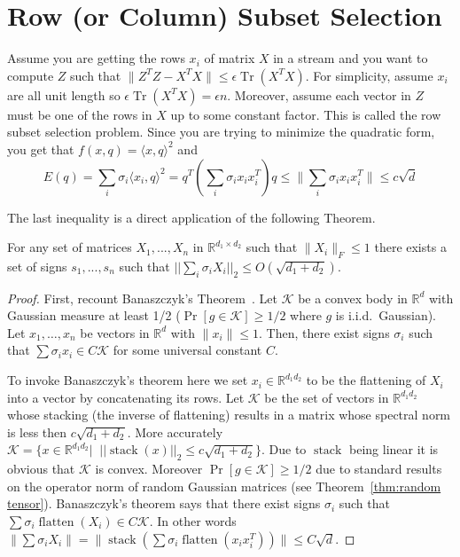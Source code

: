 \documentclass[anon,12pt]{colt2019} %
\newcommand{\R}{\mathbb{R}}
\newcommand{\eps}{\epsilon}
\renewcommand{\Pr}{\operatorname{Pr}}
\begin{document}
\section{Row (or Column) Subset Selection}
Assume you are getting the rows $x_i$  of matrix $X$ in a stream and you want to compute $Z$ such that $\|Z^TZ - X^TX\| \le \eps \operatorname{Tr}(X^TX)$.
For simplicity, assume $x_i$ are all unit length so $\eps \operatorname{Tr}(X^TX) = \eps n$. Moreover, assume each vector in $Z$ must be one of the rows in $X$ up to some constant factor.
This is called the row subset selection problem. 
Since you are trying to minimize the quadratic form, you get that $f(x, q) = \langle x,q \rangle ^2$ and 
$$E(q) = \sum_i \sigma_i \langle x_i,q \rangle ^2 = q^T (\sum_i \sigma_i x_i x_i^T ) q \le \|\sum_i \sigma_i x_i x_i^T\| \le c\sqrt{d}$$

\noindent The last inequality is a direct application of the following Theorem.
\begin{theorem}\label{BansalInDaHouz}
For any set of matrices $X_1,...,X_n$ in $\R^{d_1 \times d_2}$ such that $\|X_i\|_{F} \le 1$ there exists a set of signs $s_1,...,s_n$ such that $||\sum_i \sigma_i X_i||_{2} \le O(\sqrt{d_1 + d_2})$.
\end{theorem}
\begin{proof}
First, recount Banaszczyk's Theorem~\cite{Banaszczyk}.
Let $\mathcal K$ be a convex body in $\R^d$ with Gaussian measure at least 1/2 ($\Pr[g \in \mathcal K] \ge 1/2$ where $g$ is i.i.d.\ Gaussian).
Let $x_1,\ldots,x_n$ be vectors in $\R^d$ with $\|x_i\| \le 1$. 
Then, there exist signs $\sigma_i$ such that $\sum \sigma_i x_i \in C \mathcal K$ for some universal constant $C$.

To invoke Banaszczyk's theorem here we set $x_i \in \R^{d_1d_2}$ to be the flattening of $X_i$ into a vector by concatenating its rows. 
Let $\mathcal K$ be the set of vectors in $\R^{d_1d_2}$ whose stacking (the inverse of flattening) results in a matrix whose spectral norm is less then $c\sqrt{d_1 + d_2}$.
More accurately $\mathcal K = \{x  \in \R^{d_1d_2} |\;\; ||\operatorname{stack}(x)||_2 \le c\sqrt{d_1+d_2}\}$. 
Due to $\operatorname{stack}$ being linear it is obvious that $\mathcal K$ is convex. 
Moreover $\Pr[g \in \mathcal K] \ge 1/2$ due to standard results on the operator norm of random Gaussian matrices (see Theorem~\ref{thm:random tensor}).
Banaszczyk's theorem says that there exist signs $\sigma_i$ such that $\sum \sigma_i \operatorname{flatten}(X_i) \in C \mathcal K$.
In other words $\| \sum \sigma_i X_i\| = \| \operatorname{stack}( \sum \sigma_i \operatorname{flatten}(x_i x_i^T)) \| \le C \sqrt{d}$. 

\end{proof}
\end{document}
